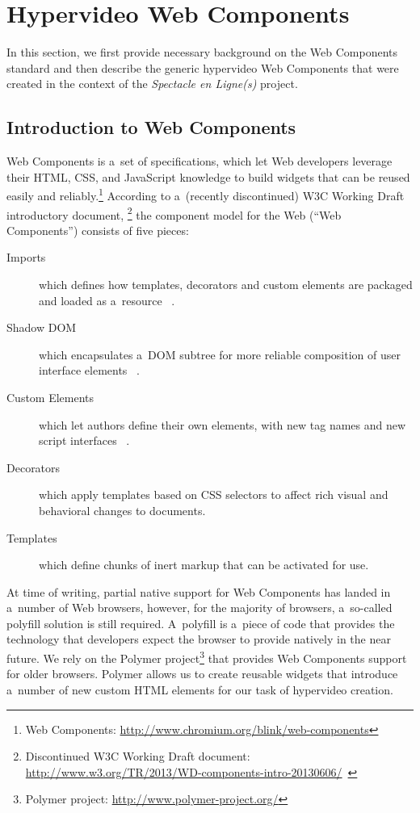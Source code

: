 \documentclass[runningheads,a4paper]{llncs}
\begin{document}
\section{Hypervideo Web Components}
\label{sec:hypervideo-web-components}

In this section, we first provide necessary background on the Web Components standard
and then describe the generic hypervideo Web Components
that were created in the context of the \emph{Spectacle en Ligne(s)} project.

\subsection{Introduction to Web Components}

Web Components is a~set of specifications, which let Web developers leverage
their HTML, CSS, and JavaScript knowledge to build widgets
that can be reused easily and reliably.\footnote{Web Components:
\url{http://www.chromium.org/blink/web-components}}
According to a~(recently discontinued) W3C Working Draft introductory document,%
\footnote{Discontinued W3C Working Draft document:
\url{http://www.w3.org/TR/2013/WD-components-intro-20130606/}~\cite{cooney2013webcomponents}}
the component model for the Web (``Web Components'') consists of five pieces:

\begin{description}
  \item[Imports] which defines how templates, decorators and custom elements are packaged and loaded as a~resource%
  ~\cite{glazkov2014htmlimports}.
  \item[Shadow DOM] which encapsulates a~DOM subtree for more reliable composition of user interface elements%
  ~\cite{glazkov2014shadowdom}.    
  \item[Custom Elements] which let authors define their own elements, with new tag names and new script interfaces%
  ~\cite{glazkov2013customelements}.  
  \item[Decorators] which apply templates based on CSS selectors to affect rich visual and behavioral changes to documents.
  \item[Templates] which define chunks of inert markup that can be activated for use.  
\end{description}

\noindent At time of writing, partial native support for Web Components
has landed in a~number of Web browsers,
however, for the majority of browsers,
a~so-called polyfill solution is still required.
A~polyfill  is a~piece of code that provides the technology
that developers expect the browser to provide natively in the near future.
We rely on the Polymer project\footnote{Polymer project:
\url{http://www.polymer-project.org/}}
that provides Web Components support for older browsers.
Polymer allows us to create reusable widgets that introduce a~number of new
custom HTML elements for our task of hypervideo creation.
\end{document}
